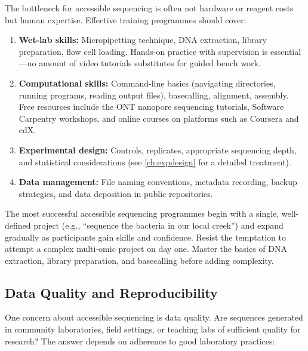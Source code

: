 The bottleneck for accessible sequencing is often not hardware or reagent costs but human expertise. Effective training programmes should cover:

\begin{enumerate}[itemsep=2pt]
  \item \textbf{Wet-lab skills:} Micropipetting technique, DNA extraction, library preparation, flow cell loading. Hands-on practice with supervision is essential---no amount of video tutorials substitutes for guided bench work.
  \item \textbf{Computational skills:} Command-line basics (navigating directories, running programs, reading output files), basecalling, alignment, assembly. Free resources include the \acrshort{ONT} nanopore sequencing tutorials, Software Carpentry workshops, and online courses on platforms such as Coursera and edX.
  \item \textbf{Experimental design:} Controls, replicates, appropriate sequencing depth, and statistical considerations (see \cref{ch:expdesign} for a detailed treatment).
  \item \textbf{Data management:} File naming conventions, metadata recording, backup strategies, and data deposition in public repositories.
\end{enumerate}

\begin{tipbox}[title={Start Simple, Iterate}]
The most successful accessible sequencing programmes begin with a single, well-defined project (e.g., ``sequence the bacteria in our local creek'') and expand gradually as participants gain skills and confidence. Resist the temptation to attempt a complex multi-omic project on day one. Master the basics of DNA extraction, library preparation, and basecalling before adding complexity.
\end{tipbox}

\subsection{Data Quality and Reproducibility}
\label{subsec:accessible:quality}

One concern about accessible sequencing is data quality. Are sequences generated in community laboratories, field settings, or teaching labs of sufficient quality for research? The answer depends on adherence to good laboratory practices:

